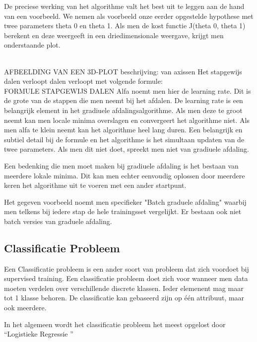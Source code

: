 De preciese werking van het algorithme valt het best uit te leggen aan de hand van een voorbeeld. We nemen als voorbeeld onze eerder opgestelde hypothese met twee parameters theta 0 en theta 1. Als men de kost functie J(theta 0, theta 1) berekent en deze weergeeft in een driedimensionale weergave, krijgt men onderstaande plot.

\\
AFBEELDING VAN EEN 3D-PLOT
beschrijving: van axissen
\newline
Het stapgewijs dalen verloopt dalen verloopt met volgende formule:
\\
\newline
FORMULE STAPGEWIJS DALEN
\newline
\newline
Alfa noemt men hier de learning rate. Dit is de grote van de stappen die men neemt bij het afdalen. De learning rate is een belangrijk element in het gradiuele afdalingsalgorithme. Als men deze te groot neemt kan men locale minima overslagen en convergeert het algorithme niet. Als men alfa te klein neemt kan het algorithme heel lang duren. 
\newline
Een belangrijk en subtiel detail bij de formule en het algorithme is het simultaan updaten van de twee parameters. Als men dit niet doet, spreekt men niet van gradiuele afdaling.

Een bedenking die men moet maken bij gradiuele afdaling is het bestaan van meerdere lokale minima. Dit kan men echter eenvoudig oplossen door meerdere keren het algorithme uit te voeren met een ander startpunt.

Het gegeven voorbeeld noemt men specifieker "Batch graduele afdaling" waarbij men telkens bij iedere stap de hele trainingsset vergelijkt. Er bestaan ook niet batch versies van graduele afdaling.

\subsection{Classificatie Probleem}\label{Classificatie Probleem}

Een Classificatie probleem is een ander soort van probleem dat zich voordoet bij supervised training. Een classificatie probleem doet zich voor wanneer men data moeten verdelen over verschillende discrete klassen. Ieder elemenent mag maar tot 1 klasse behoren. De classificatie kan gebaseerd zijn op één attribuut, maar ook meerdere.

In het algemeen wordt het classificatie probleem het meest opgelost door ``Logistieke Regressie ''

